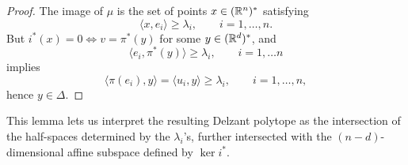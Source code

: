 \begin{proof}
	The image of $\mu$ is the set of points $x \in (\mathbb{R}^{n})^{\ast}$ satisfying
	\begin{equation*}
		\langle x, e_{i} \rangle \geq \lambda_{i},\qquad i = 1,\ldots, n.
	\end{equation*}
	But $i^{\ast}(x) = 0 \iff v = \pi^{\ast}(y)$ for some $y \in (\mathbb{R}^{d})^{\ast}$, and
	\begin{equation*}
		\langle e_{i}, \pi^{\ast}(y) \rangle \geq \lambda_{i}, \qquad i = 1,\ldots n
	\end{equation*}
	implies
	\begin{equation*}
		\langle \pi(e_{i}), y \rangle = \langle u_{i}, y \rangle \geq \lambda_{i},\qquad i = 1,\ldots, n,
	\end{equation*}
	hence $y \in \Delta$.
\end{proof}
This lemma lets us interpret the resulting Delzant polytope as the intersection of the half-spaces determined by the $\lambda_{i}$'s, further intersected with the $(n-d)$-dimensional affine subspace defined by $\ker i^{\ast}$.


